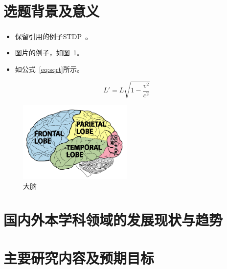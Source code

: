 \documentclass[onecolumn,a4paper,12pt]{article}
\newcommand\song{\CJKfamily{song}}
\begin{document}
\newcommand{\supercite}[1]{\textsuperscript{\cite{#1}}}

\newpage
{}
\tableofcontents

\newpage
{}

\section{选题背景及意义}
\song

\begin{itemize}
\item 保留引用的例子STDP~\supercite{izhikevich2007solving}。
\item 图片的例子，如图~\ref{fig:brain}。
\item 如公式~\ref{eq:sqrt}所示。
\end{itemize}

\begin{equation}
 L' = {L}{\sqrt{1-\frac{v^2}{c^2}}}
\end{equation}\label{eq:sqrt}

\begin{figure}[!ht]
  \centering
\includegraphics[width=0.5\textwidth]{img/brain.png}
  \caption{大脑} 
  \label{fig:brain}
\end{figure}

\newpage
\section{国内外本学科领域的发展现状与趋势}

\clearpage
\newpage
\section{主要研究内容及预期目标}
\end{document}
